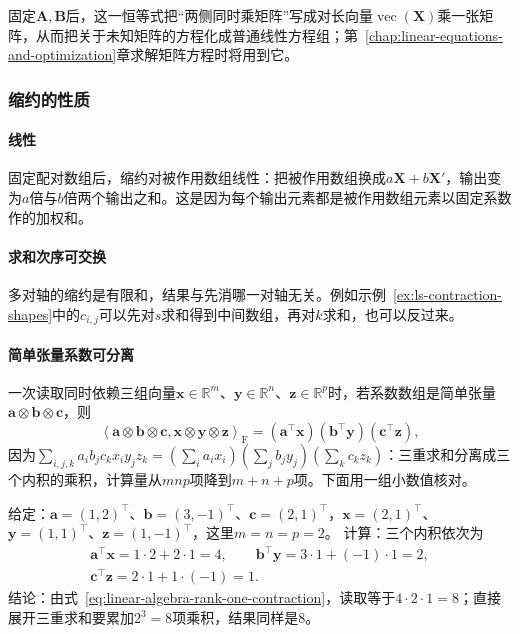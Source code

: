 固定$\bm A,\bm B$后，这一恒等式把“两侧同时乘矩阵”写成对长向量$\operatorname{vec}(\bm X)$乘一张矩阵，从而把关于未知矩阵的方程化成普通线性方程组；第~\ref{chap:linear-equations-and-optimization}章求解矩阵方程时将用到它。

\subsubsection{缩约的性质}

\paragraph{线性}
固定配对数组后，缩约对被作用数组线性：把被作用数组换成$a\bm X+b\bm X'$，输出变为$a$倍与$b$倍两个输出之和。这是因为每个输出元素都是被作用数组元素以固定系数作的加权和。

\paragraph{求和次序可交换}
多对轴的缩约是有限和，结果与先消哪一对轴无关。例如示例~\ref{ex:ls-contraction-shapes}中的$c_{i,j}$可以先对$s$求和得到中间数组，再对$k$求和，也可以反过来。

\paragraph{简单张量系数可分离}
一次读取同时依赖三组向量$\bm x\in\mathbb R^m$、$\bm y\in\mathbb R^n$、$\bm z\in\mathbb R^p$时，若系数数组是简单张量$\bm a\otimes\bm b\otimes\bm c$，则
\begin{equation}
 \left\langle\bm a\otimes\bm b\otimes\bm c,
 \bm x\otimes\bm y\otimes\bm z\right\rangle_{\mathrm F}
 =(\bm a^\top\bm x)(\bm b^\top\bm y)(\bm c^\top\bm z),
 \label{eq:linear-algebra-rank-one-contraction}
\end{equation}
因为$\sum_{i,j,k}a_ib_jc_kx_iy_jz_k=(\sum_ia_ix_i)(\sum_jb_jy_j)(\sum_kc_kz_k)$：三重求和分离成三个内积的乘积，计算量从$mnp$项降到$m+n+p$项。下面用一组小数值核对。
\begin{example}[简单张量系数的分离计算]
\label{ex:ls-rank-one-contraction-check}
给定：$\bm a=(1,2)^\top$、$\bm b=(3,-1)^\top$、$\bm c=(2,1)^\top$，$\bm x=(2,1)^\top$、$\bm y=(1,1)^\top$、$\bm z=(1,-1)^\top$，这里$m=n=p=2$。
计算：三个内积依次为
\[
 \begin{gathered}
 \bm a^\top\bm x=1\cdot2+2\cdot1=4,\qquad
 \bm b^\top\bm y=3\cdot1+(-1)\cdot1=2,\\
 \bm c^\top\bm z=2\cdot1+1\cdot(-1)=1.
 \end{gathered}
\]
结论：由式~\eqref{eq:linear-algebra-rank-one-contraction}，读取等于$4\cdot2\cdot1=8$；直接展开三重求和要累加$2^3=8$项乘积，结果同样是$8$。
\end{example}

